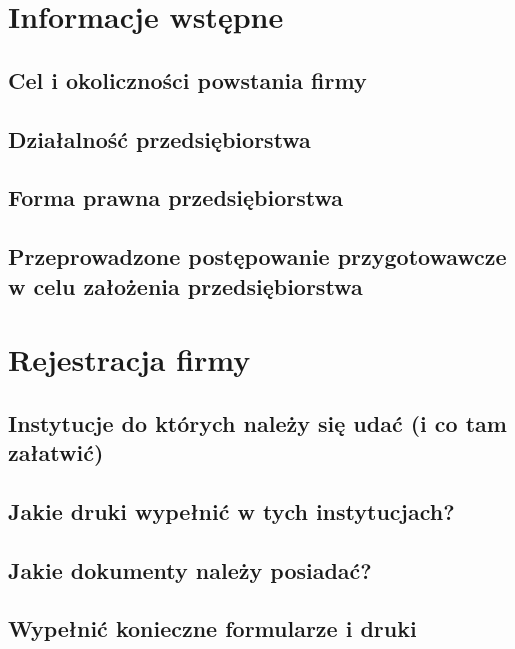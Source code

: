 \documentclass{sprawozdanie-agh}
\begin{document}
   


	\stronatytulowa{}

	\section{Informacje wstępne}

		\subsection{Cel i okoliczności powstania firmy}
		\subsection{Działalność przedsiębiorstwa}
		\subsection{Forma prawna przedsiębiorstwa}
		\subsection{Przeprowadzone postępowanie przygotowawcze w celu założenia przedsiębiorstwa}

	\section{Rejestracja firmy}

		\subsection{Instytucje do których należy się udać (i co tam załatwić)}
		\subsection{Jakie druki wypełnić w tych instytucjach?}
		\subsection{Jakie dokumenty należy posiadać?}
		\subsection{Wypełnić konieczne formularze i druki}
\end{document}
